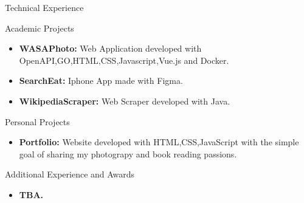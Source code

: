 \documentclass[]{mcdowellcv}
\begin{document}
	\begin{cvsection}{Technical Experience}
		\begin{cvsubsection}{Academic Projects}{}{}
			\begin{itemize}
				\item \textbf{WASAPhoto:} Web Application developed with OpenAPI,GO,HTML,CSS,Javascript,Vue.js and Docker.
				\item \textbf{SearchEat:} Iphone App made with Figma.
				\item \textbf{WikipediaScraper:} Web Scraper developed with Java.
			\end{itemize}
		\end{cvsubsection}
		\begin{cvsubsection}{Personal Projects}{}{}
			\begin{itemize}
				\item  \textbf{Portfolio:} Website developed with HTML,CSS,JavaScript with the simple goal of sharing my photograpy and book reading passions.
			\end{itemize}
		\end{cvsubsection}
	\end{cvsection}
	
	\begin{cvsection}{Additional Experience and Awards}
		\begin{cvsubsection}{}{}{}	
			\begin{itemize}
				\item \textbf{TBA.} 
			\end{itemize}
		\end{cvsubsection}
	\end{cvsection}
	
	
\end{document}
